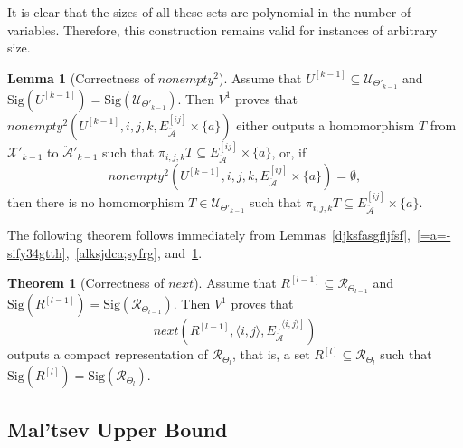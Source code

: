 \documentclass{article}
\theoremstyle{definition}
\theoremstyle{theorem}
\newtheorem{thm}{Theorem}
\newtheorem{lem}{Lemma}
\theoremstyle{theorem}
\theoremstyle{remark}
\theoremstyle{remark}
\theoremstyle{example}
\theoremstyle{notation}
\theoremstyle{theorem}
\begin{document}
It is clear that the sizes of all these sets are polynomial in the number of variables. Therefore, this construction remains valid for instances of arbitrary size.

\begin{lem}[Correctness of $nonempty^2$]\label{lalaskksdjjd}
Assume that $U^{[k-1]} \subseteq \mathscr{U}_{\Theta'_{k-1}}$ and $\mathrm{Sig}(U^{[k-1]}) = \mathrm{Sig}(\mathscr{U}_{\Theta'_{k-1}})$. Then 
$V^1$ proves that $nonempty^2(U^{[k-1]}, i, j, k, E^{[ij]}_{\ddot{\mathcal{A}}} \times \{a\})$ either outputs a homomorphism $T$ from $\mathcal{X}'_{k-1}$ to $\ddot{\mathcal{A}}'_{k-1}$ such that $\pi_{i, j, k}T \subseteq E^{[ij]}_{\ddot{\mathcal{A}}} \times \{a\}$, or, if
\[
nonempty^2(U^{[k-1]}, i, j, k, E^{[ij]}_{\ddot{\mathcal{A}}} \times \{a\}) = \emptyset,
\]
then there is no homomorphism $T \in \mathscr{U}_{\Theta'_{k-1}}$ such that $\pi_{i, j, k}T \subseteq E^{[ij]}_{\ddot{\mathcal{A}}} \times \{a\}$.
\end{lem}

The following theorem follows immediately from Lemmas~\ref{djksfasgfljfsf},~\ref{=a=-sify34gtth},~\ref{alksjdca;syfrg}, and~\ref{lalaskksdjjd}.

\begin{thm}[Correctness of $next$]\label{alalksldkjk}
Assume that $R^{[l-1]} \subseteq \mathscr{R}_{\Theta_{l-1}}$ and $\mathrm{Sig}(R^{[l-1]}) = \mathrm{Sig}(\mathscr{R}_{\Theta_{l-1}})$. Then 
$V^1$ proves that 
\[
next(R^{[l-1]}, \langle i, j \rangle, E^{[\langle i, j \rangle]}_{\ddot{\mathcal{A}}})
\]
outputs a compact representation of $\mathscr{R}_{\Theta_l}$, that is, a set $R^{[l]} \subseteq \mathscr{R}_{\Theta_l}$ such that $\mathrm{Sig}(R^{[l]}) = \mathrm{Sig}(\mathscr{R}_{\Theta_l})$.

\end{thm}
 

\subsection{Mal’tsev Upper Bound}\label{alskdjf';lahdg'a}
\end{document}
